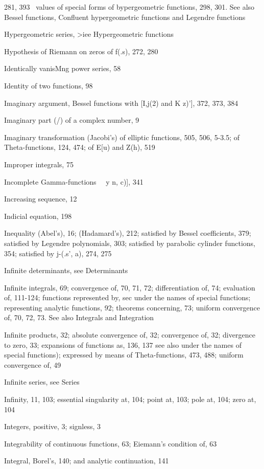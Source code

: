 281, 393 \ values of special forms of bypergeometric functions, 298, 301. See also Bessel
functions, Confluent hypergeometric functions and Legendre functions

Hypergeometric series, >iee Hypergeometric functions

Hypothesis of Riemann on zeros of f(.s), 272, 280

Identically vanisMng power series, 58

Identity of two functions, 98

Imaginary argument, Bessel functions with [I,j(2) and K  z)'], 372, 373, 384

Imaginary part (/) of a complex number, 9

Imaginary transformation (Jacobi's) of elliptic functions, 505, 506, 5-3.5; of Theta-functions, 124,
474; of E[u) and Z(h), 519

Improper integrals, 75

Incomplete Gamma-functions \ \  y n, c)], 341

Increasing sequence, 12

Indicial equation, 198

Inequality (Abel's), 16; (Hadamard's), 212; satisfied by Bessel coefficients, 379; satisfied by
Legendre polynomials, 303; satisfied by parabolic cylinder functions, 354; satisfied by
j-(.s', a), 274, 275

Infinite determinants, see Determinants

Infinite integrals, 69; convergence of, 70, 71, 72; differentiation of, 74; evaluation of, 111-124;
functions represented by, sec under the names of special functions; representing analytic
functions, 92; theorems concerning, 73; uniform convergence of, 70, 72, 73. See also
Integrals and Integration

Infinite products, 32; absolute convergence of, 32; convergence of, 32; divergence to zero, 33;
expansions of functions as, 136, 137  see also under the names of special functions); expressed
by means of Theta-functions, 473, 488; uniform convergence of, 49

Infinite series, see Series

Infinity, 11, 103; essential singularity at, 104; point at, 103; pole at, 104; zero at, 104

Integers, positive, 3; signless, 3

Integrability of continuous functions, 63; Eiemann's condition of, 63

Integral, Borel's, 140; and analytic continuation, 141

